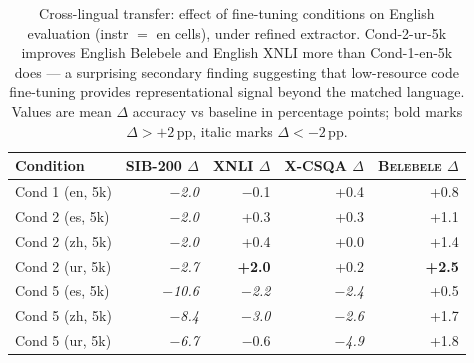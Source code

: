 \begin{table}[t]
  \centering
  \small
  \begin{tabular}{lrrrr}
    \toprule
    Condition & \textsc{SIB-200} $\Delta$ & \textsc{XNLI} $\Delta$ & \textsc{X-CSQA} $\Delta$ & \textsc{Belebele} $\Delta$ \\
    \midrule
    Cond 1 (en, 5k) & \textit{$-$2.0} & $-$0.1 & +0.4 & +0.8 \\
    Cond 2 (es, 5k) & \textit{$-$2.0} & +0.3 & +0.3 & +1.1 \\
    Cond 2 (zh, 5k) & \textit{$-$2.0} & +0.4 & +0.0 & +1.4 \\
    Cond 2 (ur, 5k) & \textit{$-$2.7} & \textbf{+2.0} & +0.2 & \textbf{+2.5} \\
    Cond 5 (es, 5k) & \textit{$-$10.6} & \textit{$-$2.2} & \textit{$-$2.4} & +0.5 \\
    Cond 5 (zh, 5k) & \textit{$-$8.4} & \textit{$-$3.0} & \textit{$-$2.6} & +1.7 \\
    Cond 5 (ur, 5k) & \textit{$-$6.7} & $-$0.6 & \textit{$-$4.9} & +1.8 \\
    \bottomrule
  \end{tabular}
  \caption{Cross-lingual transfer: effect of fine-tuning conditions on English evaluation (instr $=$ en cells), under refined extractor. Cond-2-ur-5k improves English Belebele and English XNLI more than Cond-1-en-5k does --- a surprising secondary finding suggesting that low-resource code fine-tuning provides representational signal beyond the matched language. Values are mean $\Delta$ accuracy vs baseline in percentage points; bold marks $\Delta > +2$\,pp, italic marks $\Delta < -2$\,pp.}
  \label{tab:cross-lingual-transfer}
\end{table}


